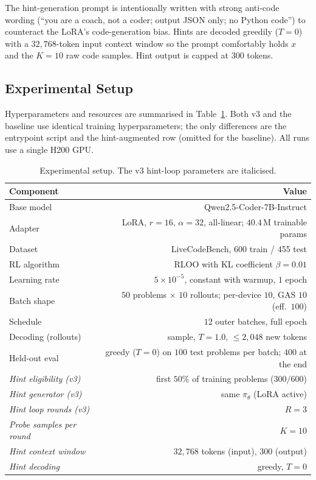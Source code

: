 The hint-generation prompt is intentionally written with strong
anti-code wording (``you are a coach, not a coder; output JSON only; no
Python code'') to counteract the LoRA's code-generation bias. Hints are
decoded greedily ($T = 0$) with a $32{,}768$-token input context window
so the prompt comfortably holds $x$ and the $K = 10$ raw code samples.
Hint output is capped at $300$ tokens.

\subsection{Experimental Setup}

Hyperparameters and resources are summarised in Table~\ref{tab:setup}.
Both v3 and the baseline use identical training hyperparameters; the
only differences are the entrypoint script and the hint-augmented row
(omitted for the baseline). All runs use a single H200 GPU.

\begin{table}[h]
\centering
\caption{Experimental setup. The v3 hint-loop parameters are
italicised.}
\label{tab:setup}
\small
\begin{tabular}{lr}
\toprule
\textbf{Component} & \textbf{Value} \\
\midrule
Base model            & Qwen2.5-Coder-7B-Instruct \\
Adapter               & LoRA, $r{=}16$, $\alpha{=}32$, all-linear; $40.4\,\mathrm{M}$ trainable params \\
Dataset               & LiveCodeBench, 600 train / 455 test \\
RL algorithm          & RLOO with KL coefficient $\beta = 0.01$ \\
Learning rate         & $5\times 10^{-5}$, constant with warmup, $1$ epoch \\
Batch shape           & $50$ problems $\times$ $10$ rollouts; per-device $10$, GAS $10$ (eff.\ $100$) \\
Schedule              & $12$ outer batches, full epoch \\
Decoding (rollouts)   & sample, $T = 1.0$, $\le 2{,}048$ new tokens \\
Held-out eval         & greedy ($T = 0$) on $100$ test problems per batch; $400$ at the end \\
\midrule
\emph{Hint eligibility (v3)}     & first $50\%$ of training problems ($300/600$) \\
\emph{Hint generator (v3)}       & same $\pi_\theta$ (LoRA active) \\
\emph{Hint loop rounds (v3)}     & $R = 3$ \\
\emph{Probe samples per round}   & $K = 10$ \\
\emph{Hint context window}       & $32{,}768$ tokens (input), $300$ (output) \\
\emph{Hint decoding}             & greedy, $T = 0$ \\
\bottomrule
\end{tabular}
\end{table}

